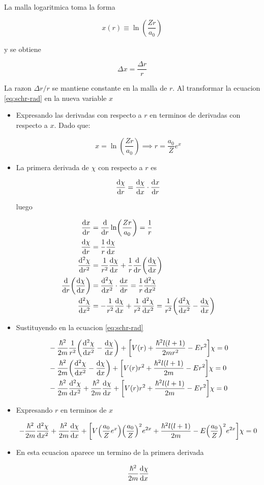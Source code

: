 \documentclass[11pt]{article}
\begin{document}
La malla logaritmica toma la forma

\[ x(r) \equiv \ln(\frac{Zr}{a_0}) \]

y se obtiene

\[ \Delta x = \frac{\Delta r}{r} \]

La razon \(\Delta r / r\) se mantiene constante en la malla de \(r\). Al transformar la ecuacion \ref{eq:schr-rad} en la nueva variable \(x\)

\begin{itemize}
\item Expresando las derivadas con respecto a \(r\) en terminos de derivadas con respecto a \(x\). Dado que:

\[ x = \ln(\frac{Zr}{a_0}) \implies r = \frac{a_0}{Z}e^x \]

\item La primera derivada de \(\chi\) con respecto a \(r\) es

\[ \dv{\chi}{r} = \dv{\chi}{x}\cdot \dv{x}{r} \]

luego

\begin{align*}
    \dv{x}{r} &= \dv{r}\ln(\frac{Zr}{a_0}) = \frac{1}{r} \\
    \dv{\chi}{r} &= \frac{1}{r} \dv{\chi}{x} \\
    \dv[2]{\chi}{r} &= \frac{1}{r^2} \dv{\chi}{x} + \frac{1}{r}\dv{r}(\dv{\chi}{x}) \\
    \dv{r}(\dv{\chi}{x}) &= \dv[2]{\chi}{x} \cdot \dv{x}{r} = \frac{1}{r} \dv[2]{\chi}{x} \\
    \dv[2]{\chi}{x} &= - \frac{1}{r^2}\dv{\chi}{x} + \frac{1}{r^2}\dv[2]{\chi}{x} = \frac{1}{r^2}\qty(\dv[2]{\chi}{x} - \dv{\chi}{x})
\end{align*}

\item Sustituyendo en la ecuacion \ref{eq:schr-rad}

\begin{align*}
&- \frac{\hbar^2}{2m} \frac{1}{r^2} \qty(\dv[2]{\chi}{x}-\dv{\chi}{x}) + \qty[V(r) + \frac{\hbar^2 l(l+1)}{2mr^2} - E r^2]\chi = 0 \\
&- \frac{\hbar^2}{2m}\qty(\dv[2]{\chi}{x}-\dv{\chi}{x}) + \qty[V(r) r^2 + \frac{\hbar^2 l(l+1)}{2m} - E r^2]\chi = 0 \\
&- \frac{\hbar^2}{2m}\dv[2]{\chi}{x} + \frac{\hbar^2}{2m}\dv{\chi}{x} + \qty[V(r)r^2 + \frac{\hbar^2 l(l+1)}{2m}-Er^2]\chi = 0
\end{align*}

\item Expresando \(r\) en terminos de \(x\)

\[ - \frac{\hbar^2}{2m}\dv[2]{\chi}{x} + \frac{\hbar^2}{2m}\dv{\chi}{x} + \qty[V\qty(\frac{a_0}{Z}e^x)\qty(\frac{a_0}{Z})^2 e^{2x} + \frac{\hbar^2l(l+1)}{2m}- E\qty(\frac{a_0}{Z})^2e^{2x}]\chi = 0 \]

\item En esta ecuacion aparece un termino de la primera derivada

\[ \frac{\hbar^2}{2m} \dv{\chi}{x} \]
\end{itemize}
\end{document}
